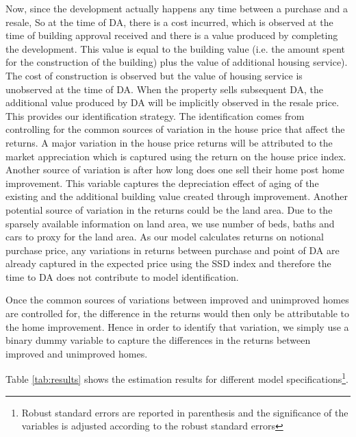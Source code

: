 \documentclass{article}
\begin{document}
Now, since the development actually happens any time between a purchase and a resale, So at the time of DA, there is a cost incurred, which is observed at the time of building approval received and there is a value produced by completing the development. This value is equal to the building value (i.e. the amount spent for the construction of the building) plus the value of additional housing service). The cost of construction is observed but the value of housing service is unobserved at the time of DA. When the property sells subsequent DA, the additional value produced by DA will be implicitly observed in the resale price. This provides our identification strategy. The identification comes from controlling for the common sources of variation in the house price that affect the returns. A major variation in the house price returns will be attributed to the market appreciation which is captured using the return on the house price index. Another source of variation is after how long does one sell their home post home improvement. This variable captures the depreciation effect of aging of the existing and the additional building value created through improvement. Another potential source of variation in the returns could be the land area. Due to the sparsely available information on land area, we use number of beds, baths and cars to proxy for the land area. As our model calculates returns on notional purchase price, any variations in returns between purchase and point of DA are already captured in the expected price using the SSD index and therefore the time to DA does not contribute to model identification. 

Once the common sources of variations between improved and unimproved homes are controlled for, the difference in the returns would then only be attributable to the home improvement. Hence in order to identify that variation, we simply use a binary dummy variable to capture the differences in the returns between improved and unimproved homes.

Table \ref{tab:results} shows the estimation results for different model specifications\footnote{Robust standard errors are reported in parenthesis and the significance of the variables is adjusted according to the robust standard errors}. 

\clearpage
{}

\restoregeometry
\end{document}
